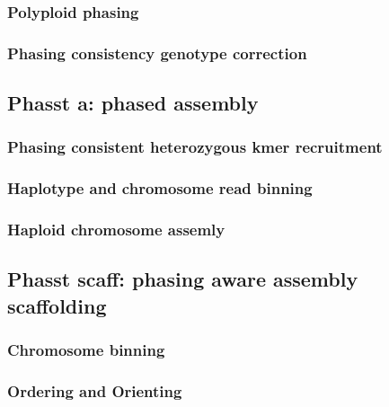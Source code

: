\subsubsection{Polyploid phasing}
\subsubsection{Phasing consistency genotype correction}
\subsection{Phasst a: phased assembly}
\subsubsection{Phasing consistent heterozygous kmer recruitment}
\subsubsection{Haplotype and chromosome read binning}
\subsubsection{Haploid chromosome assemly}
\subsection{Phasst scaff: phasing aware assembly scaffolding}
\subsubsection{Chromosome binning}
\subsubsection{Ordering and Orienting}


